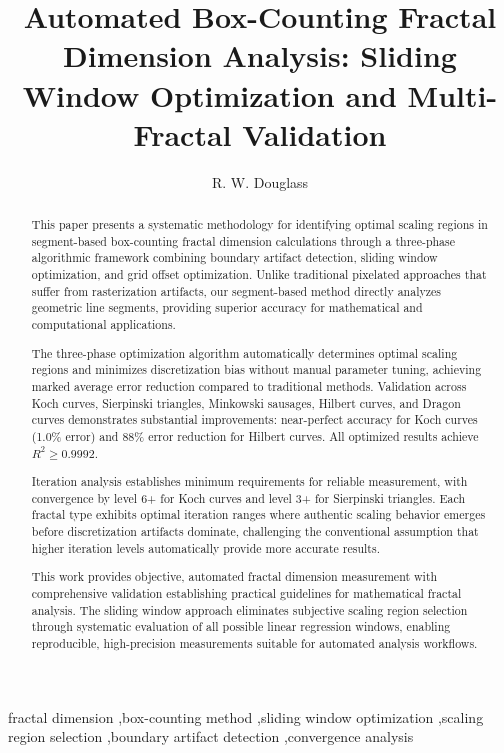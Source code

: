 \documentclass[preprint,12pt]{elsarticle}
\begin{document}
\begin{frontmatter}

\title{Automated Box-Counting Fractal Dimension Analysis: Sliding Window Optimization and Multi-Fractal Validation}

\author{R. W. Douglass}



\begin{abstract}
This paper presents a systematic methodology for identifying optimal scaling regions in segment-based box-counting fractal dimension calculations through a three-phase algorithmic framework combining boundary artifact detection, sliding window optimization, and grid offset optimization. Unlike traditional pixelated approaches that suffer from rasterization artifacts, our segment-based method directly analyzes geometric line segments, providing superior accuracy for mathematical and computational applications.

The three-phase optimization algorithm automatically determines optimal scaling regions and minimizes discretization bias without manual parameter tuning, achieving marked average error reduction compared to traditional methods. Validation across Koch curves, Sierpinski triangles, Minkowski sausages, Hilbert curves, and Dragon curves demonstrates substantial improvements: near-perfect accuracy for Koch curves (1.0\% error) and 88\% error reduction for Hilbert curves. All optimized results achieve $R^2 \geq 0.9992$.

Iteration analysis establishes minimum requirements for reliable measurement, with convergence by level 6+ for Koch curves and level 3+ for Sierpinski triangles. Each fractal type exhibits optimal iteration ranges where authentic scaling behavior emerges before discretization artifacts dominate, challenging the conventional assumption that higher iteration levels automatically provide more accurate results.

This work provides objective, automated fractal dimension measurement with comprehensive validation establishing practical guidelines for mathematical fractal analysis. The sliding window approach eliminates subjective scaling region selection through systematic evaluation of all possible linear regression windows, enabling reproducible, high-precision measurements suitable for automated analysis workflows.
\end{abstract}

\begin{keyword}
fractal dimension \sep box-counting method \sep sliding window optimization \sep scaling region selection \sep boundary artifact detection \sep convergence analysis
\end{keyword}

\end{frontmatter}
\end{document}
